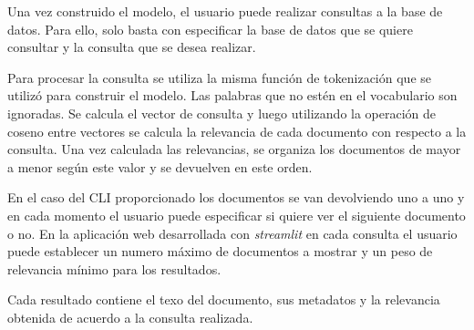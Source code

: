 Una vez construido el modelo, el usuario puede realizar consultas a la base de
datos. Para ello, solo basta con especificar la base de datos que se quiere
consultar y la consulta que se desea realizar. 

Para procesar la consulta se utiliza la misma función de tokenización que se
utilizó para construir el modelo. Las palabras que no estén en el vocabulario
son ignoradas. Se calcula el vector de consulta y luego utilizando la operación
de coseno entre vectores se calcula la relevancia de cada documento con
respecto a la consulta. Una vez calculada las relevancias, se organiza los
documentos de mayor a menor según este valor y se devuelven en este orden.

En el caso del CLI proporcionado los documentos se van devolviendo uno a uno
y en cada momento el usuario puede especificar si quiere ver el siguiente
documento o no. En la aplicación web desarrollada con \emph{streamlit} en cada
consulta el usuario puede establecer un numero máximo de documentos a mostrar
y un peso de relevancia mínimo para los resultados.

Cada resultado contiene el texo del documento, sus metadatos y la relevancia 
obtenida de acuerdo a la consulta realizada.
